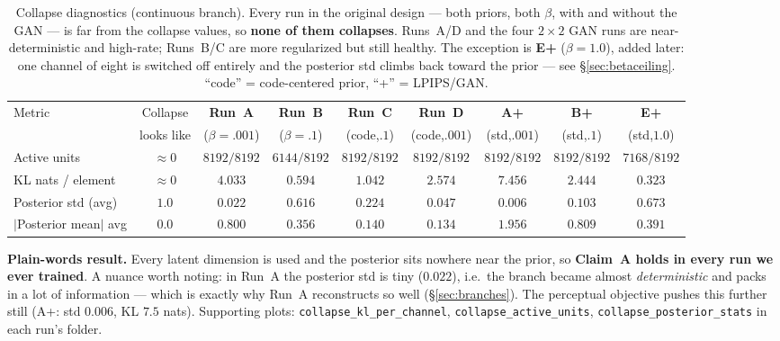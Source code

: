 \documentclass[11pt]{article}
\newcommand{\good}[1]{\textcolor{green!55!black}{#1}}
\newcommand{\bad}[1]{\textcolor{red!70!black}{#1}}
\begin{document}
\begin{table}[h]
\centering
\caption{Collapse diagnostics (continuous branch). Every run in the original design --- both
priors, both $\beta$, with and without the GAN --- is far from the collapse values, so
\textbf{none of them collapses}. Runs~A/D and the four $2\times2$ GAN runs are near-deterministic
and high-rate; Runs~B/C are more regularized but still healthy. The exception is
\textbf{E+} ($\beta{=}1.0$), added later: one channel of eight is switched off entirely and the
posterior std climbs back toward the prior --- see \S\ref{sec:betaceiling}.
``code'' = code-centered prior, ``+'' = LPIPS/GAN.}
\label{tab:collapse}
\small
\setlength{\tabcolsep}{4.5pt}
\begin{tabular}{lcccccccc}
\toprule
Metric & Collapse & \textbf{Run~A} & \textbf{Run~B} & \textbf{Run~C} & \textbf{Run~D} & \textbf{A+} & \textbf{B+} & \textbf{E+}\\
       & looks like & ($\beta{=}.001$) & ($\beta{=}.1$) & (code,$.1$) & (code,$.001$) & (std,$.001$) & (std,$.1$) & (std,$1.0$)\\
\midrule
Active units            & $\approx 0$ & \good{$8192/8192$} & \good{$6144/8192$} & \good{$8192/8192$} & \good{$8192/8192$} & \good{$8192/8192$} & \good{$8192/8192$} & \bad{$7168/8192$}\\
KL nats / element       & $\approx 0$ & \good{$4.033$}     & \good{$0.594$}     & \good{$1.042$}     & \good{$2.574$}     & \good{$7.456$}    & \good{$2.444$} & \bad{$0.323$}\\
Posterior std (avg)     & $1.0$       & \good{$0.022$}     & \good{$0.616$}     & \good{$0.224$}     & \good{$0.047$}     & \good{$0.006$}    & \good{$0.103$} & \bad{$0.673$}\\
$|$Posterior mean$|$ avg& $0.0$       & \good{$0.800$}     & \good{$0.356$}     & \good{$0.140$}     & \good{$0.134$}     & \good{$1.956$}    & \good{$0.809$} & $0.391$\\
\bottomrule
\end{tabular}
\end{table}

\textbf{Plain-words result.} Every latent dimension is used and the posterior sits nowhere
near the prior, so \textbf{Claim~A holds in every run we ever trained}. A nuance worth
noting: in Run~A the posterior std is tiny ($0.022$), i.e.\ the branch became almost
\emph{deterministic} and packs in a lot of information --- which is exactly why Run~A
reconstructs so well (\S\ref{sec:branches}). The perceptual objective pushes this further still
(A+: std $0.006$, KL $7.5$ nats). Supporting plots:
\texttt{collapse\_kl\_per\_channel}, \texttt{collapse\_active\_units},
\texttt{collapse\_posterior\_stats} in each run's folder.
\end{document}
